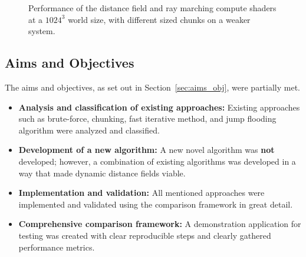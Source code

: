\begin{figure}

    \caption{Performance of the distance field and ray marching compute shaders at a $1024^3$ world size, with
        different sized chunks on a weaker system.}
    \label{fig:final_df_perf_alt}
\end{figure}

\subsection{Aims and Objectives}
The aims and objectives, as set out in Section~\ref{sec:aims_obj}, were partially met.

\begin{itemize}
    \item \textbf{Analysis and classification of existing approaches:} Existing approaches such as brute-force, chunking,
          fast iterative method, and jump flooding algorithm were analyzed and classified.
    \item \textbf{Development of a new algorithm:} A new novel algorithm was \textbf{not} developed; however, a
          combination of existing algorithms was developed in a way that made dynamic distance fields viable.
    \item \textbf{Implementation and validation:} All mentioned approaches were implemented and validated using the
          comparison framework in great detail.
    \item \textbf{Comprehensive comparison framework:} A demonstration application for testing was created with clear
          reproducible steps and clearly gathered performance metrics.
\end{itemize}

